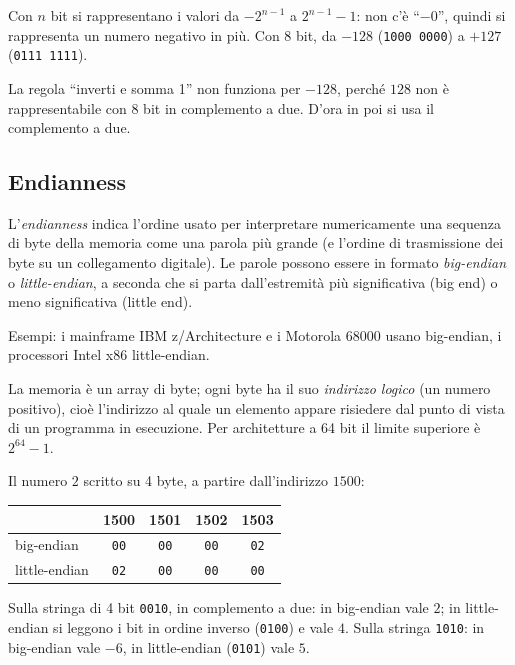 \documentclass[11pt,a4paper]{article}
\begin{document}
Con $n$ bit si rappresentano i valori da $-2^{n-1}$ a $2^{n-1} - 1$: non c'è
``$-0$'', quindi si rappresenta un numero negativo in più. Con 8 bit, da $-128$
(\texttt{1000 0000}) a $+127$ (\texttt{0111 1111}).

\begin{osservazione}
La regola ``inverti e somma 1'' non funziona per $-128$, perché $128$ non è
rappresentabile con 8 bit in complemento a due. D'ora in poi si usa il complemento
a due.
\end{osservazione}

\subsection{Endianness}

\begin{definizione}
L'\emph{endianness} indica l'ordine usato per interpretare numericamente una
sequenza di byte della memoria come una parola più grande (e l'ordine di
trasmissione dei byte su un collegamento digitale). Le parole possono essere in
formato \emph{big-endian} o \emph{little-endian}, a seconda che si parta
dall'estremità più significativa (big end) o meno significativa (little end).
\end{definizione}

Esempi: i mainframe IBM z/Architecture e i Motorola 68000 usano big-endian, i
processori Intel x86 little-endian.

La memoria è un array di byte; ogni byte ha il suo \emph{indirizzo logico}
(un numero positivo), cioè l'indirizzo al quale un elemento appare risiedere dal
punto di vista di un programma in esecuzione. Per architetture a 64 bit il limite
superiore è $2^{64} - 1$.

\begin{esempio}
Il numero $2$ scritto su 4 byte, a partire dall'indirizzo $1500$:
\begin{center}
\begin{tabular}{lcccc}
\toprule
 & 1500 & 1501 & 1502 & 1503 \\
\midrule
big-endian    & \texttt{00} & \texttt{00} & \texttt{00} & \texttt{02} \\
little-endian & \texttt{02} & \texttt{00} & \texttt{00} & \texttt{00} \\
\bottomrule
\end{tabular}
\end{center}
\end{esempio}

\begin{esempio}
Sulla stringa di 4 bit \texttt{0010}, in complemento a due: in big-endian vale $2$;
in little-endian si leggono i bit in ordine inverso (\texttt{0100}) e vale $4$.
Sulla stringa \texttt{1010}: in big-endian vale $-6$, in little-endian
(\texttt{0101}) vale $5$.
\end{esempio}
\end{document}
